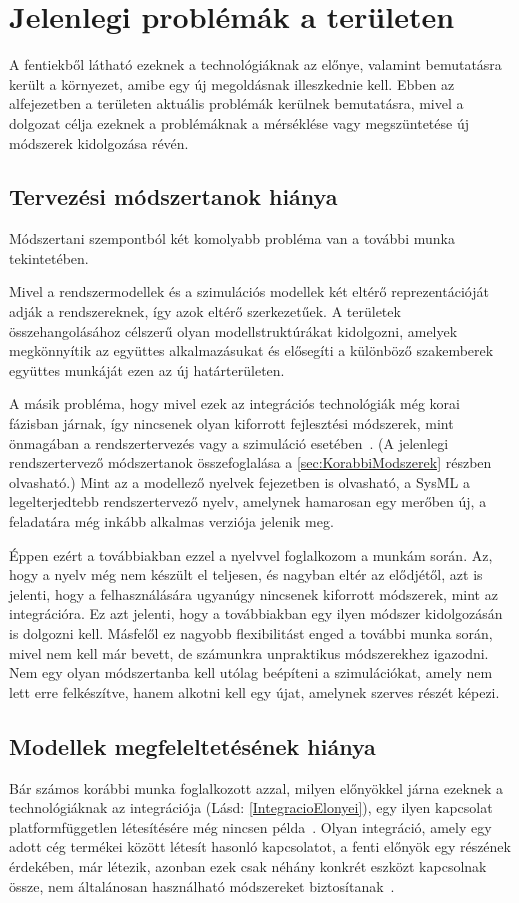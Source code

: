 \section{Jelenlegi problémák a területen}
A fentiekből látható ezeknek a technológiáknak az előnye, valamint bemutatásra került a környezet, amibe egy új megoldásnak illeszkednie kell.
Ebben az alfejezetben a területen aktuális problémák kerülnek bemutatásra, mivel a dolgozat célja ezeknek a problémáknak a mérséklése vagy megszüntetése új módszerek kidolgozása révén.

    \subsection{Tervezési módszertanok hiánya} \label{ModszertanHianya}
    Módszertani szempontból két komolyabb probléma van a további munka tekintetében.
    
    Mivel a rendszermodellek és a szimulációs modellek két eltérő reprezentációját adják a rendszereknek, így azok eltérő szerkezetűek.
    A területek összehangolásához célszerű olyan modellstruktúrákat kidolgozni, amelyek megkönnyítik az együttes alkalmazásukat és elősegíti a különböző szakemberek együttes munkáját ezen az új határterületen.

    A másik probléma, hogy mivel ezek az integrációs technológiák még korai fázisban járnak, így nincsenek olyan kiforrott fejlesztési módszerek, mint önmagában a rendszertervezés vagy a szimuláció esetében~\cite{Ma_2022}. (A jelenlegi rendszertervező módszertanok összefoglalása a \ref{sec:KorabbiModszerek} részben olvasható.)
    Mint az a modellező nyelvek fejezetben is olvasható, a SysML a legelterjedtebb rendszertervező nyelv, amelynek hamarosan egy merőben új, a feladatára még inkább alkalmas verziója jelenik meg.
    
    Éppen ezért a továbbiakban ezzel a nyelvvel foglalkozom a munkám során.
    Az, hogy a nyelv még nem készült el teljesen, és nagyban eltér az elődjétől, azt is jelenti, hogy a felhasználására ugyanúgy nincsenek kiforrott módszerek, mint az integrációra.
    Ez azt jelenti, hogy a továbbiakban egy ilyen módszer kidolgozásán is dolgozni kell. Másfelől ez nagyobb flexibilitást enged a további munka során, mivel nem kell már bevett, de számunkra unpraktikus módszerekhez igazodni. Nem egy olyan módszertanba kell utólag beépíteni a szimulációkat, amely nem lett erre felkészítve, hanem alkotni kell egy újat, amelynek szerves részét képezi.

    \subsection{Modellek megfeleltetésének hiánya}
    Bár számos korábbi munka foglalkozott azzal, milyen előnyökkel járna ezeknek a technológiáknak az integrációja (Lásd: \ref{IntegracioElonyei}), egy ilyen kapcsolat platformfüggetlen létesítésére még nincsen példa~\cite{Ma_2022}.
    Olyan integráció, amely egy adott cég termékei között létesít hasonló kapcsolatot, a fenti előnyök egy részének érdekében, már létezik, azonban ezek csak néhány konkrét eszközt kapcsolnak össze, nem általánosan használható módszereket biztosítanak~\cite{SystemComposer}.

